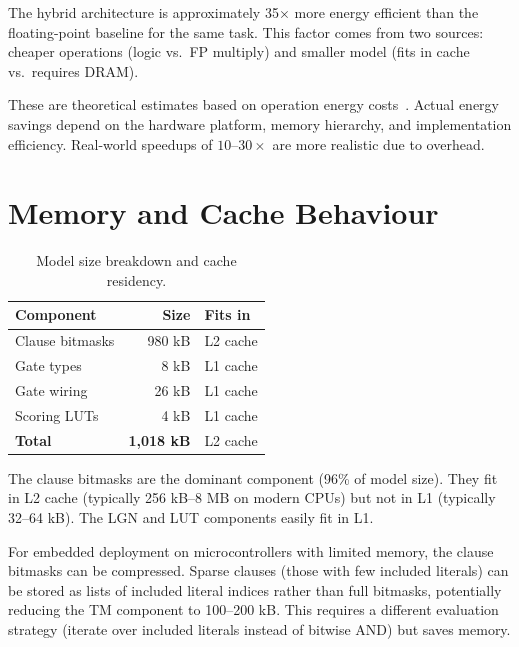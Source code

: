 \begin{keyinsight}
The hybrid architecture is approximately 35$\times$ more energy
efficient than the floating-point baseline for the same task. This
factor comes from two sources: cheaper operations (logic vs.\ FP
multiply) and smaller model (fits in cache vs.\ requires DRAM).
\end{keyinsight}

These are theoretical estimates based on operation energy costs~\cite{horowitz2014energy,wheeldon2020pervasive}.
Actual energy savings depend on the hardware platform, memory
hierarchy, and implementation efficiency. Real-world speedups of
$10$--$30\times$ are more realistic due to overhead.


\section{Memory and Cache Behaviour}
\label{sec:cache}

\begin{table}[htbp]
\centering
\caption{Model size breakdown and cache residency.}
\label{tab:model-size}
\begin{tabular}{@{}lrl@{}}
  \toprule
  \textbf{Component} & \textbf{Size} & \textbf{Fits in} \\
  \midrule
  Clause bitmasks & 980 kB & L2 cache \\
  Gate types & 8 kB & L1 cache \\
  Gate wiring & 26 kB & L1 cache \\
  Scoring LUTs & 4 kB & L1 cache \\
  \midrule
  \textbf{Total} & \textbf{1,018 kB} & L2 cache \\
  \bottomrule
\end{tabular}
\end{table}

The clause bitmasks are the dominant component (96\% of model size).
They fit in L2 cache (typically 256 kB--8 MB on modern CPUs) but not
in L1 (typically 32--64 kB). The LGN and LUT components easily fit
in L1.

\begin{engineernote}
For embedded deployment on microcontrollers with limited memory, the
clause bitmasks can be compressed. Sparse clauses (those with few
included literals) can be stored as lists of included literal indices
rather than full bitmasks, potentially reducing the TM component to
100--200 kB. This requires a different evaluation strategy (iterate
over included literals instead of bitwise AND) but saves memory.
\end{engineernote}


